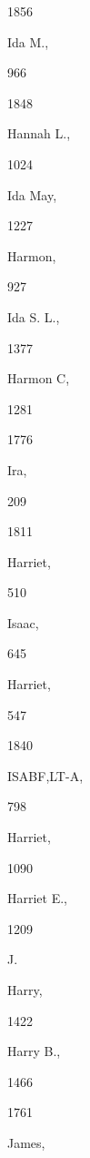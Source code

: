{1856 


Ida M., 


966 


1848 


Hannah L., 


1024 




Ida May, 


1227 




Harmon, 


927 




Ida S. L., 


1377 




Harmon C, 


1281 


1776 


Ira, 


209 


1811 


Harriet, 


510 




Isaac, 


645 




Harriet, 


547 


1840 


ISABF,LT-A, 


798 




Harriet, 


1090 










Harriet E., 


1209 




J. 






Harry, 


1422 










Harry B., 


1466 


1761 


James, 


}

